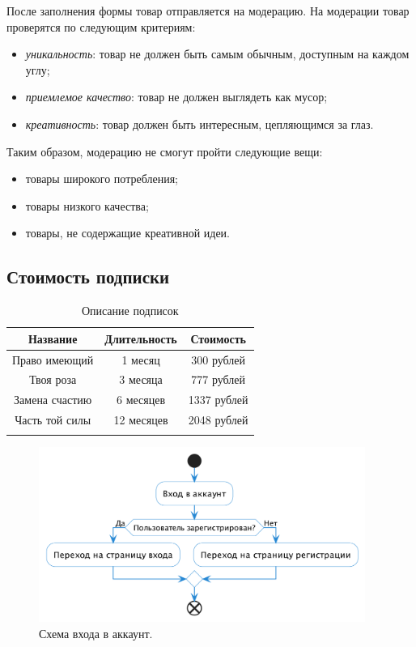 \documentclass[a4paper,14pt]{extarticle}
\begin{document}
После заполнения формы товар отправляется на модерацию. На модерации товар проверятся по следующим критериям:
\begin{itemize}
    \item \textit{уникальность}: товар не должен быть самым обычным, доступным на каждом углу;
    \item \textit{приемлемое качество}: товар не должен выглядеть как мусор;
    \item \textit{креативность}: товар должен быть интересным, цепляющимся за глаз.
\end{itemize}
Таким образом, модерацию не смогут пройти следующие вещи:
\begin{itemize}
    \item товары широкого потребления;
    \item товары низкого качества;
    \item товары, не содержащие креативной идеи.
\end{itemize}


\subsection{Стоимость подписки}

\begin{center}
    \renewcommand{\arraystretch}{1.5}
    \setlength{\tabcolsep}{1.75em}
    \begin{longtable}{|c|c|c|}
        \hline
        \textbf{Название} & \textbf{Длительность} & \textbf{Стоимость} \\
        \hline
        Право имеющий     & 1 месяц               & 300 рублей         \\
        \hline
        Твоя роза         & 3 месяца              & 777 рублей         \\
        \hline
        Замена счастию    & 6 месяцев             & 1337 рублей        \\
        \hline
        Часть той силы    & 12 месяцев            & 2048 рублей        \\
        \hline
        \caption{Описание подписок}
    \end{longtable}
\end{center}

\begin{figure}[H]
    \centering
    \includegraphics[width=0.95\textwidth]{images/login.png}
    \caption{Схема входа в аккаунт.}
\end{figure}
\end{document}
